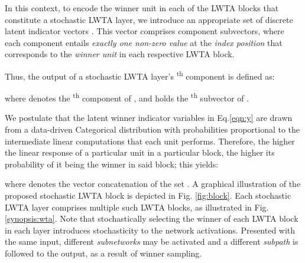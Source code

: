 \documentclass{article}
\begin{document}
	In this context, to encode the winner unit in each of the  LWTA blocks that constitute a stochastic LWTA layer, we introduce an appropriate set of discrete latent indicator vectors . This vector comprises  component subvectors, where each component entails \textit{exactly one non-zero value} at the \textit{index position} that corresponds to the \textit{winner unit} in each respective LWTA block. 
	
	Thus, the output  of a stochastic LWTA layer's \textsuperscript{th} component  is defined as:

where  denotes the \textsuperscript{th} component of , and  holds the \textsuperscript{th} subvector of .

	We postulate that the latent winner indicator variables  in Eq.\eqref{eqn:y} are drawn from a data-driven Categorical distribution with probabilities proportional to the intermediate linear computations that each unit performs. Therefore, the higher the linear response of a particular unit in a particular block, the higher its probability of it being the winner in said block; this yields:

where  denotes the vector concatenation of the set . A graphical illustration of the proposed stochastic LWTA block is depicted in Fig. \ref{fig:block}. Each stochastic LWTA layer comprises multiple such LWTA blocks, as illustrated in Fig. \ref{synopsis:wta}. Note that stochastically selecting the winner of each LWTA block in each layer introduces stochasticity to the network activations. Presented with the same input, different \textit{subnetworks} may be activated and a different \textit{subpath} is followed to the output, as a result of winner sampling.
\end{document}
